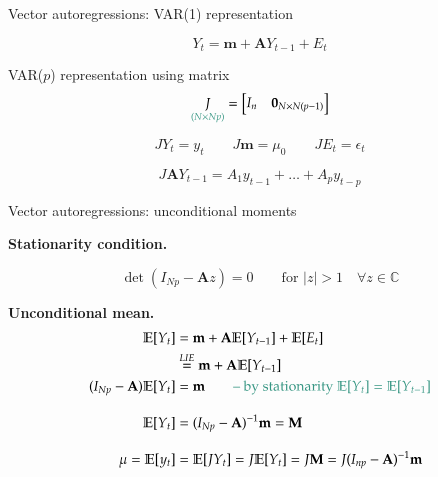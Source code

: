 \documentclass[notes,blackandwhite,mathsans,usenames,dvipsnames]{beamer}
\begin{document}
\begin{frame}{Vector autoregressions: VAR(1) representation}

$$ Y_t = \mathbf{m} + \mathbf{A} Y_{t-1} + E_t $$

 VAR($p$) {\color{mcxs2}representation using matrix}
$$ \underset{\color{mcxs2}(N\times Np)}{J} = \begin{bmatrix} I_n & \mathbf{0}_{N\times N(p-1)} \end{bmatrix} $$

\bigskip$$ JY_t = y_t \qquad J\mathbf{m} = \mu_0 \qquad  JE_t = \epsilon_t $$

$$ J\mathbf{A} Y_{t-1} = A_1 y_{t-1} + \dots + A_p y_{t-p} $$

\end{frame}


\begin{frame}{Vector autoregressions: unconditional moments}

\textbf{Stationarity condition.}

$$ \det(I_{Np} - \mathbf{A}z) = 0 \qquad\text{for } |z|>1 \quad\forall z\in\mathbb{C} $$

\bigskip\textbf{Unconditional mean.}
\begin{align*}
\mathbb{E}[Y_t] &= \mathbf{m} + \mathbf{A} \mathbb{E}[Y_{t-1}] + \mathbb{E}[E_t]\\
&\overset{LIE}{=} \mathbf{m} + \mathbf{A} \mathbb{E}[Y_{t-1}] \\
(I_{Np} - \mathbf{A})\mathbb{E}[Y_t] &= \mathbf{m} \qquad{\color{mcxs2}\text{-- by stationarity }\mathbb{E}[Y_t] = \mathbb{E}[Y_{t-1}]}\\[2ex]
\mathbb{E}[Y_t] &= (I_{Np} - \mathbf{A})^{-1}\mathbf{m} = \mathbf{M}\\[2ex]
\mu = \mathbb{E}[y_t] &= \mathbb{E}[JY_t]= J\mathbb{E}[Y_t]= J\mathbf{M} = J(I_{np} - \mathbf{A})^{-1}\mathbf{m}
\end{align*}

\end{frame}
\end{document}
